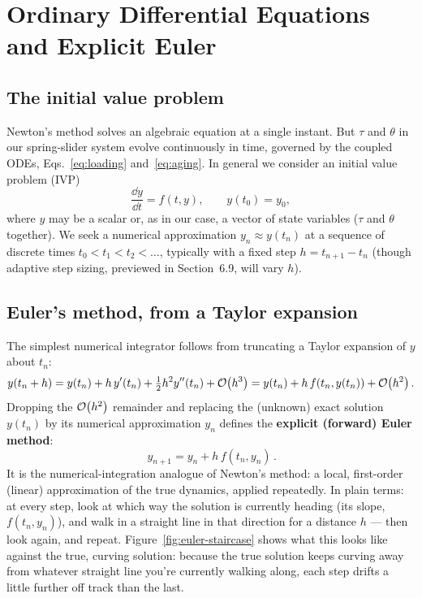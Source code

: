 \section{Ordinary Differential Equations and Explicit Euler}

\subsection{The initial value problem}

Newton's method solves an algebraic equation at a single instant. But $\tau$ and $\theta$ in our spring-slider system evolve continuously in time, governed by the coupled ODEs, Eqs.~\eqref{eq:loading} and~\eqref{eq:aging}. In general we consider an initial value problem (IVP)
\begin{equation}
\frac{\dd y}{\dd t} = f(t, y), \qquad y(t_0) = y_0,
\label{eq:ivp}
\end{equation}
where $y$ may be a scalar or, as in our case, a vector of state variables ($\tau$ and $\theta$ together). We seek a numerical approximation $y_n \approx y(t_n)$ at a sequence of discrete times $t_0 < t_1 < t_2 < \dots$, typically with a fixed step $h = t_{n+1}-t_n$ (though adaptive step sizing, previewed in Section~6.9, will vary $h$).

\subsection{Euler's method, from a Taylor expansion}

The simplest numerical integrator follows from truncating a Taylor expansion of $y$ about $t_n$:
\begin{equation}
y(t_n + h) = y(t_n) + h\,y'(t_n) + \tfrac{1}{2}h^2 y''(t_n) + \mathcal{O}\!\left(h^3\right) = y(t_n) + h\,f(t_n, y(t_n)) + \mathcal{O}\!\left(h^2\right).
\end{equation}
Dropping the $\mathcal{O}\!\left(h^2\right)$ remainder and replacing the (unknown) exact solution $y(t_n)$ by its numerical approximation $y_n$ defines the \textbf{explicit (forward) Euler method}:
\begin{equation}
\boxed{\, y_{n+1} = y_n + h\, f(t_n, y_n) \,}.
\label{eq:euler}
\end{equation}
It is the numerical-integration analogue of Newton's method: a local, first-order (linear) approximation of the true dynamics, applied repeatedly. In plain terms: at every step, look at which way the solution is currently heading (its slope, $f(t_n,y_n)$), and walk in a straight line in that direction for a distance $h$ --- then look again, and repeat. Figure~\ref{fig:euler-staircase} shows what this looks like against the true, curving solution: because the true solution keeps curving away from whatever straight line you're currently walking along, each step drifts a little further off track than the last.

